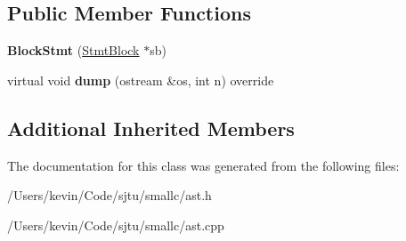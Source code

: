 \subsection*{Public Member Functions}
\begin{DoxyCompactItemize}
\item 
\mbox{\label{class_block_stmt_a950075376dfde31751d7a6ac17cb4709}} 
{\bfseries Block\+Stmt} (\hyperlink{class_stmt_block}{Stmt\+Block} $\ast$sb)
\item 
\mbox{\label{class_block_stmt_a698d06bcdd7e81efe08562b62d78672b}} 
virtual void {\bfseries dump} (ostream \&os, int n) override
\end{DoxyCompactItemize}
\subsection*{Additional Inherited Members}


The documentation for this class was generated from the following files\+:\begin{DoxyCompactItemize}
\item 
/\+Users/kevin/\+Code/sjtu/smallc/ast.\+h\item 
/\+Users/kevin/\+Code/sjtu/smallc/ast.\+cpp\end{DoxyCompactItemize}
